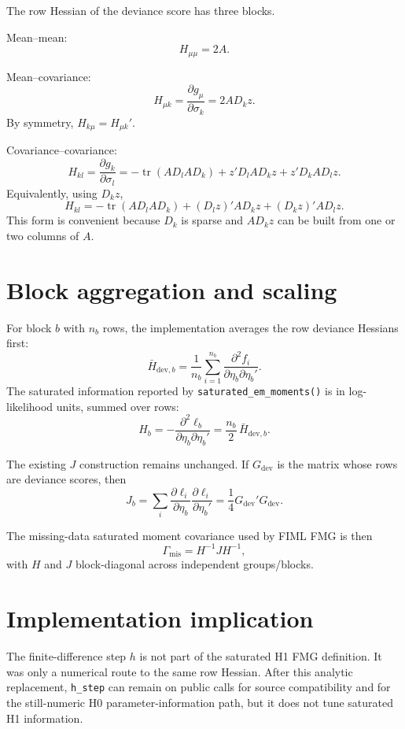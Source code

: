 \documentclass[11pt]{article}
\newcommand{\tr}{\operatorname{tr}}
\begin{document}
The row Hessian of the deviance score has three blocks.

Mean--mean:
\[
  H_{\mu\mu} = 2A.
\]

Mean--covariance:
\[
  H_{\mu k}
    = \frac{\partial g_\mu}{\partial \sigma_k}
    = 2 A D_k z.
\]
By symmetry, \(H_{k\mu}=H_{\mu k}'\).

Covariance--covariance:
\[
  H_{kl}
    = \frac{\partial g_k}{\partial \sigma_l}
    = -\tr(A D_l A D_k)
      + z'D_l A D_k z
      + z'D_k A D_l z.
\]
Equivalently, using \(D_k z\),
\[
  H_{kl}
    = -\tr(A D_l A D_k)
      + (D_lz)' A D_k z
      + (D_kz)' A D_l z.
\]
This form is convenient because \(D_k\) is sparse and \(A D_k z\) can be built
from one or two columns of \(A\).

\section*{Block aggregation and scaling}

For block \(b\) with \(n_b\) rows, the implementation averages the row
deviance Hessians first:
\[
  \bar H_{\mathrm{dev},b}
    = \frac{1}{n_b}\sum_{i=1}^{n_b}
      \frac{\partial^2 f_i}{\partial \eta_b\partial\eta_b'}.
\]
The saturated information reported by \texttt{saturated\_em\_moments()} is in
log-likelihood units, summed over rows:
\[
  H_b = -\frac{\partial^2 \ell_b}{\partial\eta_b\partial\eta_b'}
      = \frac{n_b}{2}\,\bar H_{\mathrm{dev},b}.
\]

The existing \(J\) construction remains unchanged. If \(G_{\mathrm{dev}}\) is
the matrix whose rows are deviance scores, then
\[
  J_b
    = \sum_i
      \frac{\partial\ell_i}{\partial\eta_b}
      \frac{\partial\ell_i}{\partial\eta_b'}
    = \frac14 G_{\mathrm{dev}}'G_{\mathrm{dev}}.
\]

The missing-data saturated moment covariance used by FIML FMG is then
\[
  \Gamma_{\mathrm{mis}} = H^{-1} J H^{-1},
\]
with \(H\) and \(J\) block-diagonal across independent groups/blocks.

\section*{Implementation implication}

The finite-difference step \(h\) is not part of the saturated H1 FMG
definition. It was only a numerical route to the same row Hessian. After this
analytic replacement, \texttt{h\_step} can remain on public calls for source
compatibility and for the still-numeric H0 parameter-information path, but it
does not tune saturated H1 information.
\end{document}
